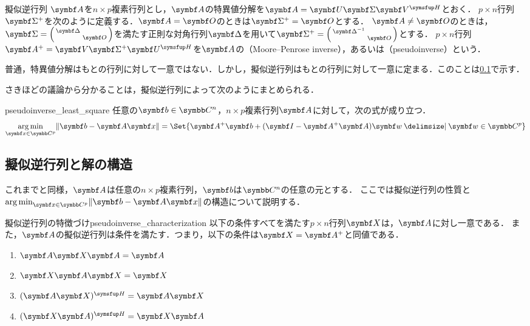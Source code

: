 \documentclass[../../main]{subfiles}
\begin{document}
\begin{definition}{擬似逆行列}{}
  \(\mat{A}\)を\(n\times p\)複素行列とし，\(\mat{A}\)の特異値分解を\(\mat{A}=\mat{U}\mat{\Sigma}\htrps{\mat{V}}\)とおく．
  \(p\times n\)行列\(\pinv{\mat{\Sigma}}\)を次のように定義する．\(\mat{A}=\zmat\)のときは\(\pinv{\mat{\Sigma}}=\zmat\)とする．
  \(\mat{A}\neq\zmat\)のときは，\(\mat{\Sigma}=\smallmatrice{\mat{\Delta} & \\ & \zmat}\)を満たす正則な対角行列\(\mat{\Delta}\)を用いて\(\pinv{\mat{\Sigma}}=\smallmatrice{\mat{\Delta}^{-1} & \\ & \zmat}\)とする．
  \(p\times n\)行列\(\pinv{\mat{A}}=\mat{V}\pinv{\mat{\Sigma}}\htrps{\mat{U}}\)を\(\mat{A}\)の（Moore–Penrose inverse），あるいは（pseudoinverse）という．
\end{definition}

\begin{note}
  普通，特異値分解はもとの行列に対して一意ではない．しかし，擬似逆行列はもとの行列に対して一意に定まる．このことは\cref{subsection:pseudoinverse}で示す．
\end{note}

さきほどの議論から分かることは，擬似逆行列によって次のようにまとめられる．

\begin{proposition}{}{pseudoinverse_least_square}
  任意の\(\vect{b}\in\numset{C}^n\)，\(n\times p\)複素行列\(\mat{A}\)に対して，次の式が成り立つ．
  \[
    \argmin_{\vect{x}\in\numset{C}^p}\vnorm{\vect{b}-\mat{A}\vect{x}} = \Set{\pinv{\mat{A}}\vect{b}+(\imat-\pinv{\mat{A}}\mat{A})\vect{w}\given\vect{w}\in\numset{C}^p}
  \]
\end{proposition}

\subsection{擬似逆行列と解の構造}
\label{subsection:pseudoinverse}

これまでと同様，\(\mat{A}\)は任意の\(n\times p\)複素行列，\(\vect{b}\)は\(\numset{C}^n\)の任意の元とする．
ここでは擬似逆行列の性質と\(\argmin_{\vect{x}\in\numset{C}^p}\vnorm{\vect{b}-\mat{A}\vect{x}}\)の構造について説明する．

\begin{proposition}{擬似逆行列の特徴づけ}{pseudoinverse_characterization}
  以下の条件すべてを満たす\(p\times n\)行列\(\mat{X}\)は，\(\mat{A}\)に対し一意である．
  また，\(\mat{A}\)の擬似逆行列は条件を満たす．つまり，以下の条件は\(\mat{X}=\pinv{\mat{A}}\)と同値である．
  \begin{enumerate}
    \item \(\mat{A}\mat{X}\mat{A}=\mat{A}\)
    \item \(\mat{X}\mat{A}\mat{X}=\mat{X}\)
    \item \(\htrps{(\mat{A}\mat{X})}=\mat{A}\mat{X}\)
    \item \(\htrps{(\mat{X}\mat{A})}=\mat{X}\mat{A}\)
  \end{enumerate}
\end{proposition}
\end{document}
